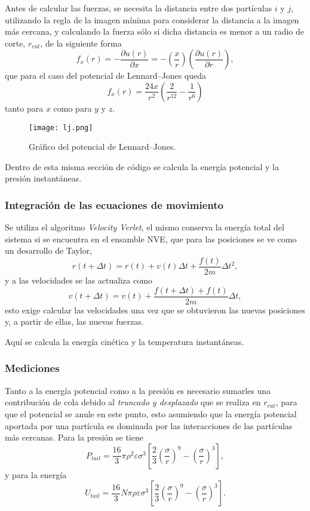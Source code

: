 \documentclass[a4paper,spanish,12pt,twoside]{article}
\begin{document}
Antes de calcular las fuerzas, se necesita la distancia entre dos partículas $i$ y $j$, utilizando la regla de la imagen mínima para considerar la distancia a la imagen más cercana, y calculando la fuerza sólo si dicha distancia es menor a un radio de corte, $r_{cut}$, de la siguiente forma
$$
f_x(r) = -\frac{\partial u(r)}{\partial x} = - \left(\frac{x}{r}\right) \left( \frac{\partial u(r)}{\partial r} \right),
$$
que para el caso del potencial de Lennard--Jones queda
$$
f_x(r) = \frac{24x}{r^2} \left( \frac{2}{r^{12}} - \frac{1}{r^6} \right)
$$
tanto para $x$ como para $y$ y $z$.

\begin{figure}[h]
	\centering
	\texttt{[image: lj.png]}
	\caption{Gráfico del potencial de Lennard--Jones.}
	\label{fig:lj}
\end{figure}

Dentro de esta misma sección de código se calcula la energía potencial y la presión instantáneas. 

\subsubsection{Integración de las ecuaciones de movimiento}

Se utiliza el algoritmo \textit{Velocity Verlet}, el mismo conserva la energía total del sistema si se encuentra en el ensamble NVE, que para las posiciones se ve como un desarrollo de Taylor,
$$
r(t + \Delta t) = r(t) + v(t) \Delta t + \frac{f(t)}{2m} \Delta t^2,
$$
y a las velocidades se las actualiza como
$$
v(t + \Delta t) = v(t) + \frac{f(t + \Delta t) + f(t)}{2m} \Delta t,
$$
esto exige calcular las velocidades una vez que se obtuvieron las nuevas posiciones y, a partir de ellas, las nuevas fuerzas.

Aquí se calcula la energía cinética y la temperatura instantáneas.

\subsubsection{Mediciones}

Tanto a la energía potencial como a la presión es necesario sumarles una contribución de cola debido al \textit{truncado y desplazado} que se realiza en $r_{cut}$, para que el potencial se anule en este punto, esto asumiendo que la energía potencial aportada por una partícula es dominada por las interacciones de las partículas más cercanas. Para la presión se tiene
$$
P_{tail} = \frac{16}{3}\pi\rho^2\varepsilon\sigma^3 \left[ \frac{2}{3}\left( \frac{\sigma}{r} \right)^9 - \left( \frac{\sigma}{r} \right)^3 \right],
$$
y para la energía
$$
U_{tail} = \frac{16}{3}N\pi\rho\varepsilon\sigma^3 \left[ \frac{2}{3}\left( \frac{\sigma}{r} \right)^9 - \left( \frac{\sigma}{r} \right)^3 \right].
$$
\end{document}
